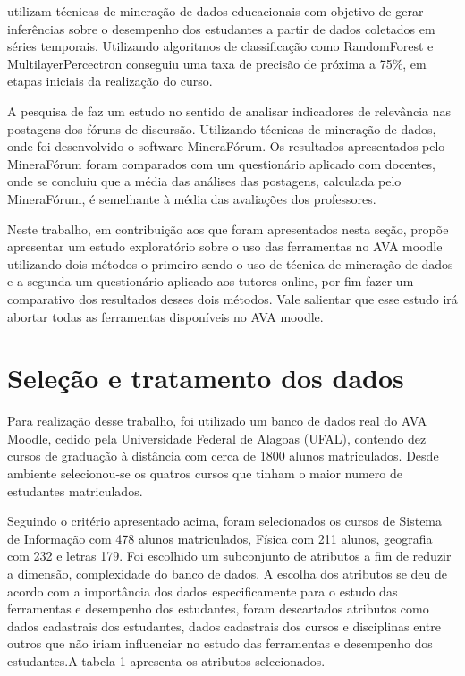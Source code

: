 \documentclass[12pt]{article}
\begin{document}
\cite{Gottardo:09} utilizam técnicas de mineração de dados educacionais com objetivo de gerar inferências sobre o desempenho dos estudantes a partir de dados coletados em séries temporais. Utilizando algoritmos de classificação como RandomForest e MultilayerPercectron conseguiu uma taxa de precisão de próxima a 75$\%$, em etapas iniciais da realização do curso. 

A pesquisa de \cite{Azeredo:06} faz um estudo no sentido de analisar indicadores de relevância nas postagens dos fóruns de discursão. Utilizando técnicas de mineração de dados, onde foi desenvolvido o software MineraFórum. Os resultados apresentados pelo MineraFórum foram comparados com um questionário aplicado com docentes, onde se concluiu que a média das análises das postagens, calculada pelo MineraFórum, é semelhante à média das avaliações dos professores.

Neste trabalho, em contribuição aos que foram apresentados nesta seção, propõe apresentar um estudo exploratório sobre o uso das ferramentas no AVA moodle utilizando dois métodos o primeiro sendo o uso de técnica de mineração de dados e a segunda um questionário aplicado aos tutores online, por fim fazer um comparativo dos resultados desses dois métodos. Vale salientar que esse estudo irá abortar todas as ferramentas disponíveis no AVA moodle.

\section{Seleção e tratamento dos dados}

Para realização desse trabalho, foi utilizado um banco de dados real do AVA Moodle, cedido pela Universidade Federal de Alagoas (UFAL), contendo dez cursos de graduação à distância com cerca de 1800 alunos matriculados. Desde ambiente selecionou-se os quatros cursos que tinham o maior numero de estudantes matriculados.

Seguindo o critério apresentado acima, foram selecionados os cursos de Sistema de Informação com 478 alunos matriculados, Física com 211 alunos, geografia com 232 e letras 179. Foi escolhido um subconjunto de atributos a fim de reduzir a dimensão, complexidade do banco de dados. A escolha dos atributos se deu de acordo com a importância dos dados especificamente para o estudo das ferramentas e desempenho dos estudantes, foram descartados atributos como dados cadastrais dos estudantes, dados cadastrais dos cursos e disciplinas entre outros que não iriam influenciar no estudo das ferramentas e desempenho dos estudantes.A tabela 1 apresenta os atributos selecionados.
\end{document}
